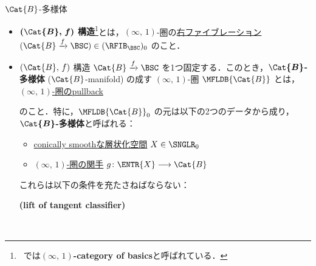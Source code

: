 \documentclass[TQFT_main]{subfiles}
\begin{document}
\begin{mydef}[label=def:B-mfld,breakable]{{$\Cat{B}$}-多様体}
    \begin{itemize}
        \item \textbf{$\bm{(\Cat{B},\, f)}$ 構造}\footnote{~\cite[Definition 1.1.6]{AFT2014stratified}では\textbf{$(\infty,\, 1)$-category of basics}と呼ばれている．}とは，$(\infty,\, 1)$-圏の\hyperref[def:infty-fib]{右ファイブレーション} $(\Cat{B} \xrightarrow{f} \BSC) \in (\RFIB_{\BSC})_0$ のこと．
        \item $(\Cat{B},\, f)$ 構造 $\Cat{B} \xrightarrow{f} \BSC$ を1つ固定する．このとき，\textbf{$\bm{\Cat{B}}$-多様体} ($\Cat{B}$-manifold) の成す $(\infty,\, 1)$-圏 $\MFLDB{\Cat{B}}$ とは，\hyperref[def:pullback-infty]{$(\infty,\, 1)$-圏のpullback}
        \begin{center}
        \end{center}
        のこと．特に，$\MFLDB{\Cat{B}}_0$ の元は以下の2つのデータから成り，\textbf{$\bm{\Cat{B}}$-多様体}と呼ばれる：
        \begin{itemize}
            \item \hyperref[def:c-smooth]{conically smoothな層状化空間} $X \in \SNGLR_0$
            \item \hyperref[def:infty-1]{$(\infty,\, 1)$-圏の関手} $g \colon \ENTR{X} \lto \Cat{B}$
        \end{itemize}
        これらは以下の条件を充たさねばならない：
        \begin{description}
            \item[\textbf{(lift of tangent classifier)}]　
            

\end{description}
\end{itemize}
\end{mydef}
\end{document}
